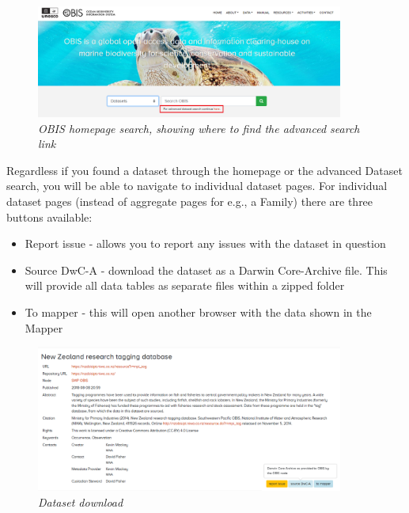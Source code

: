 \documentclass[
  letterpaper,
  DIV=11,
  numbers=noendperiod,
  oneside]{scrreprt}
\providecommand{\tightlist}{%
  \setlength{\itemsep}{0pt}\setlength{\parskip}{0pt}}\usepackage{longtable,booktabs,array}
\begin{document}
\begin{figure}

{\centering \includegraphics[width=0.9\textwidth,height=\textheight]{images/obis-homepagesearch.png}

}

\caption{\emph{OBIS homepage search, showing where to find the advanced
search link}}

\end{figure}

Regardless if you found a dataset through the homepage or the advanced
Dataset search, you will be able to navigate to individual dataset
pages. For individual dataset pages (instead of aggregate pages for
e.g., a Family) there are three buttons available:

\begin{itemize}
\tightlist
\item
  Report issue - allows you to report any issues with the dataset in
  question
\item
  Source DwC-A - download the dataset as a Darwin Core-Archive file.
  This will provide all data tables as separate files within a zipped
  folder
\item
  To mapper - this will open another browser with the data shown in the
  Mapper
\end{itemize}

\begin{figure}

{\centering \includegraphics[width=0.9\textwidth,height=\textheight]{images/dataset-DL.png}

}

\caption{\emph{Dataset download}}

\end{figure}
\end{document}
